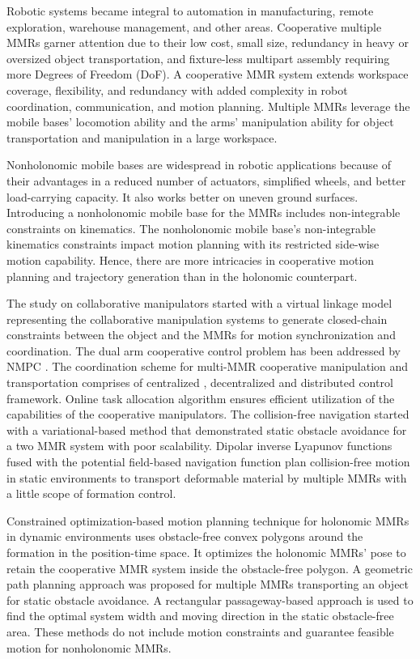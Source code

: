 Robotic systems became integral to automation in manufacturing, remote exploration, warehouse management, and other areas. Cooperative multiple MMRs garner attention due to their low cost, small size, redundancy in heavy or oversized object transportation, and fixture-less multipart assembly requiring more Degrees of Freedom (DoF). A cooperative MMR system extends workspace coverage, flexibility, and redundancy with added complexity in robot coordination, communication, and motion planning. Multiple MMRs leverage the mobile bases' locomotion ability and the arms' manipulation ability for object transportation and manipulation in a large workspace.

Nonholonomic mobile bases are widespread in robotic applications because of their advantages in a reduced number of actuators, simplified wheels, and better load-carrying capacity. It also works better on uneven ground surfaces. Introducing a nonholonomic mobile base for the MMRs includes non-integrable constraints on kinematics. The nonholonomic mobile base's non-integrable kinematics constraints impact motion planning with its restricted side-wise motion capability. Hence, there are more intricacies in cooperative motion planning and trajectory generation than in the holonomic counterpart.

The study on collaborative manipulators started with a virtual linkage model \cite{1996_khatib} representing the collaborative manipulation systems to generate closed-chain constraints \cite{2023_Xu} between the object and the MMRs for motion synchronization and coordination. The dual arm cooperative control problem has been addressed by NMPC \cite{2024_Zhao}. The coordination scheme for multi-MMR cooperative manipulation and transportation comprises of centralized \cite{2013_Erhart}, decentralized \cite{2018_Culbertson,2018_Verginis} and distributed \cite{2017_Dai,2018_Marino,2020_Ren} control framework. Online task allocation \cite{2024a_Keshab} algorithm ensures efficient utilization of the capabilities of the cooperative manipulators. The collision-free navigation started with a variational-based method \cite{1997_Desai} that demonstrated static obstacle avoidance for a two MMR system with poor scalability. Dipolar inverse Lyapunov functions fused with the potential field-based navigation function \cite{2003_Tanner} plan collision-free motion in static environments to transport deformable material by multiple MMRs with a little scope of formation control.

Constrained optimization-based motion planning technique \cite{2017_AlonsoMora} for holonomic MMRs in dynamic environments uses obstacle-free convex polygons around the formation in the position-time space. It optimizes the holonomic MMRs' pose to retain the cooperative MMR system inside the obstacle-free polygon. A geometric path planning approach was proposed \cite{2018_Cao, 2017_Jiao} for multiple MMRs transporting an object for static obstacle avoidance. A rectangular passageway-based approach \cite{2018_Cao} is used to find the optimal system width and moving direction in the static obstacle-free area. These methods do not include motion constraints and guarantee feasible motion for nonholonomic MMRs.

